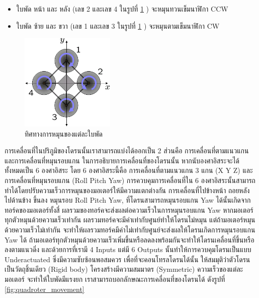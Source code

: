 \documentclass{classes/fiboReport}
\begin{document}
\begin{itemize}
	\setlength\itemsep{-0.3em}
	\item ใบพัด หน้า และ หลัง (เลข 2 และเลข 4 ในรูปที่ \ref{fig:quadroter_rotordirection} ) จะหมุนทวนเข็มนาฬิกา CCW
	\item ใบพัด ซ้าย และ ขวา (เลข 1 และเลข 3 ในรูปที่ \ref{fig:quadroter_rotordirection} ) จะหมุนตามเข็มนาฬิกา CW
\end{itemize}

\begin{figure}[ht]
	\centering
	\includegraphics[width=0.4\textwidth]{images/Quadcopter_RotorDirection.png}
	\caption{ทิศทางการหมุนของแต่ละใบพัด}
	\label{fig:quadroter_rotordirection}
\end{figure}

การเคลื่อนที่ในปริภูมิของโดรนนั้นเราสามารถแบ่งได้ออกเป็น 2 ส่วนคือ การเคลื่อนที่ตามแนวแกน
และการเคลื่อนที่หมุนรอบแกน ในการอธิบายการเคลื่อนที่ของโดรนนั้น หากนับองศาอิสระจะได้ทั้งหมดเป็น 6 องศาอิสระ
โดย 6 องศาอิสระนี้คือ การเคลื่อนที่ตามแนวแกน 3 แกน (X Y Z) และการเคลื่อนที่หมุนรอบแกน (Roll Pitch Yaw)
การควบคุมการเคลื่อนที่ใน 6 องศาอิสระนั้นสามารถทำได้โดยปรับความเร็วการหมุนของมอเตอร์ให้มีความแตกต่างกัน
การเคลื่อนที่ไปข้างหน้า ถอยหลัง ไปด้านข้าง ขึ้นลง หมุนรอบ Roll Pitch Yaw,
ที่โดรนสามารถหมุนรอบแกน Yaw ได้นั้นเกิดจากทอร์คของมอเตอร์ทั้งสี่ ผลรวมของทอร์คจะส่งผลต่อความเร็วในการหมุนรอบแกน Yaw
หากมอเตอร์ทุกตัวหมุนด้วยความเร็วเท่ากัน ผลรวมทอร์คจะมีค่าเท่ากับศูนย์ทำให้โดรนไม่หมุน แต่ถ้ามอเตอร์หมุนด้วยความเร็วไม่เท่ากัน
จะทำให้ผลรวมทอร์คมีค่าไม่เท่ากับศูนย์จะส่งผลให้โดรนเกิดการหมุนรอบแกน Yaw ได้
ถ้ามอเตอร์ทุกตัวหมุนด้วยความเร็วเพิ่มขึ้นหรือลดลงพร้อมกันจะทำให้โดรนเคลื่อนที่ขึ้นหรือลงตามแนวดิ่ง
และด้วยการที่เรามี 4 Inputs แต่มี 6 Outputs นั้นทำให้การควบคุมโดรนเป็นแบบ Underactuated ซึ่งมีความซับซ้อนพอสมควร
เพื่อที่จะคอนโทรลโดรนได้นั้น ให้สมมุติว่าตัวโดรนเป็นวัตถุชิ้นเดียว (Rigid body) โครงสร้างมีความสมมาตร (Symmetric)
ความเร็วของแต่ละมอเตอร์ จะทำให้ใบพัดมีแรงยก เราสามารถบอกลักษณะการเคลื่อนที่ของโดรนได้ ดังรูปที่ \ref{fig:quadroter_movement}
\end{document}
